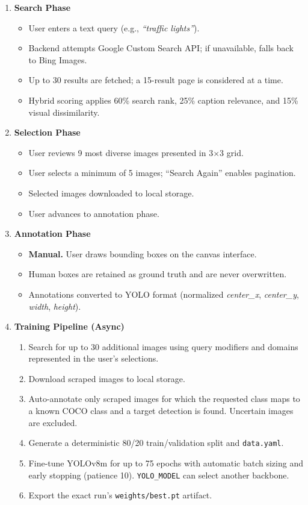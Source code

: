 \documentclass[12pt, letterpaper]{article}
\newcommand{\code}[1]{\texttt{\small\colorbox{codebg}{#1}}}
\begin{document}
\begin{enumerate}
  \item \textbf{Search Phase}
    \begin{itemize}
      \item User enters a text query (e.g., \emph{``traffic lights''}).
      \item Backend attempts Google Custom Search API; if unavailable, falls back to Bing Images.
      \item Up to 30 results are fetched; a 15-result page is considered at a time.
      \item Hybrid scoring applies 60\% search rank, 25\% caption relevance, and
        15\% visual dissimilarity.
    \end{itemize}

  \item \textbf{Selection Phase}
    \begin{itemize}
      \item User reviews 9 most diverse images presented in 3$\times$3 grid.
      \item User selects a minimum of 5 images; ``Search Again'' enables pagination.
      \item Selected images downloaded to local storage.
      \item User advances to annotation phase.
    \end{itemize}

  \item \textbf{Annotation Phase}
    \begin{itemize}
      \item \textbf{Manual.} User draws bounding boxes on the canvas interface.
      \item Human boxes are retained as ground truth and are never overwritten.
      \item Annotations converted to YOLO format (normalized \textit{center\_x},
        \textit{center\_y}, \textit{width}, \textit{height}).
    \end{itemize}

  \item \textbf{Training Pipeline (Async)}
    \begin{enumerate}[label=\alph*.]
      \item Search for up to 30 additional images using query modifiers and domains
        represented in the user's selections.
      \item Download scraped images to local storage.
      \item Auto-annotate only scraped images for which the requested class maps to a
        known COCO class and a target detection is found. Uncertain images are excluded.
      \item Generate a deterministic 80/20 train/validation split and \code{data.yaml}.
      \item Fine-tune YOLOv8m for up to 75 epochs with automatic batch sizing and
        early stopping (patience 10). \code{YOLO\_MODEL} can select another backbone.
      \item Export the exact run's \code{weights/best.pt} artifact.
    \end{enumerate}


\end{enumerate}
\end{document}
